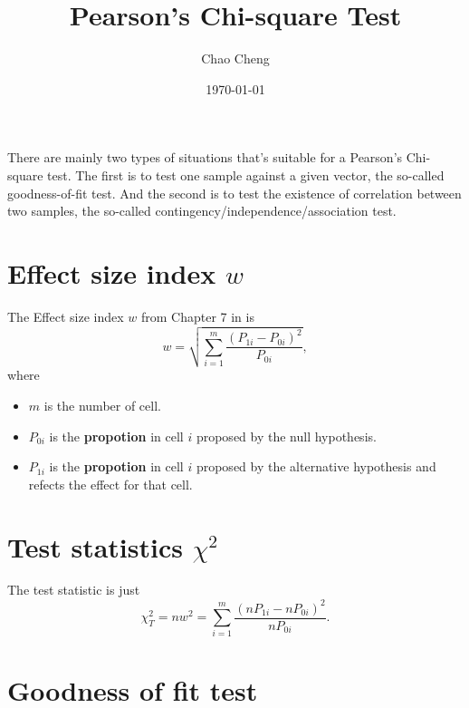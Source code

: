 \documentclass[a4paper,12pt]{article}
\title{Pearson's Chi-square Test}
\author{Chao Cheng}
\date{\today}
\begin{document}
\maketitle


There are mainly two types of situations that's suitable for a Pearson's Chi-square test. The first is to test one sample against a given vector, the so-called goodness-of-fit test. And the second is to test the existence of correlation between two samples, the so-called contingency/independence/association test.

\section{Effect size index $w$}
\label{sec:effect-size-index}

The Effect size index $w$ from Chapter 7 in \citet{Cohen2013p-} is
\begin{equation}
  \label{eq:effect_size_index}
  w = \sqrt{\sum\limits_{i = 1}^m
    \frac{
      \left(P_{1i} - P_{0i}\right)^2
    }{P_{0i}}}
  ,
\end{equation}
where
\begin{itemize}
\item $m$ is the number of cell.
\item $P_{0i}$ is the \textbf{propotion} in cell $i$ proposed by the null hypothesis.
\item $P_{1i}$ is the \textbf{propotion} in cell $i$ proposed by the alternative hypothesis and refects the effect for that cell.
\end{itemize}

\section{Test statistics $\chi^2$}
\label{sec:test-statistics-chi2}

The test statistic is just
\begin{equation}
  \label{eq:test_statistics}
  \chi^2_T = nw^2 = \sum\limits_{i = 1}^m
  \frac{\left(nP_{1i} - nP_{0i}\right)^2}{nP_{0i}}
  .
\end{equation}

\section{Goodness of fit test}
\label{sec:goodness-fit-test}
\end{document}

